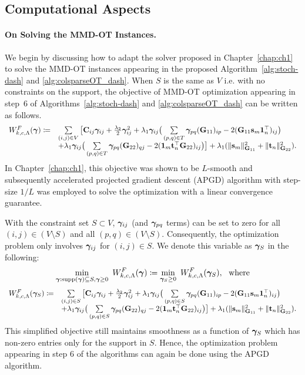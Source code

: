 \subsection{Computational Aspects}
\paragraph{On Solving the MMD-OT Instances.}\label{app:solver}
We begin by discussing how to adapt the solver proposed in Chapter~\ref{chap:ch1} to solve the MMD-OT instances appearing in the proposed Algorithm~\ref{alg:stoch-dash} and \ref{alg:colsparseOT_dash}. When $S$ is the same as $V$ i.e. with no constraints on the support, the objective of MMD-OT optimization appearing in step~6 of Algorithms~\ref{alg:stoch-dash} and \ref{alg:colsparseOT_dash} can be written as follows.
\begin{equation}
\begin{array}{ll}
W^F_{k, c, \Lambda}(\bm{\gamma})\coloneqq  &\sum\limits_{(i,j)\in V} \big[ \mathbf{C}_{ij}\bm{\gamma}_{ij} + \frac{\lambda_2}{2}\bm{\gamma}_{ij}^2 + \lambda_1 \bm{\gamma}_{ij} \big( \sum\limits_{(p,q)\in T} \bm{\gamma}_{pq} (\mathbf{G}_{11})_{ip} - 2(\mathbf{G}_{11}\mathbf{s}_m \mathbf{1}_{n}^{\top})_{ij} \big) \\
&+ \lambda_1 \bm{\gamma}_{ij} \big( \sum\limits_{(p,q)\in T} \bm{\gamma}_{pq}(\mathbf{G}_{22})_{qj} - 2 (\mathbf{1}_m\mathbf{t}_n ^\top \mathbf{G}_{22})_{ij} \big) \big]+\lambda_1(\|\mathbf{s}_m\|^2_{\mathbf{G}_{11}} + \|\mathbf{t}_n\|^2_{\mathbf{G}_{22}}).
\end{array}
\end{equation}
In Chapter~\ref{chap:ch1}, this objective was shown to be $L$-smooth and subsequently accelerated projected gradient descent (APGD) algorithm with step-size $1/L$ was employed to solve the optimization with a linear convergence guarantee.

With the constraint set $S\subset V$, $\bm{\gamma}_{ij}$ (and $\bm{\gamma}_{pq}$ terms) can be set to zero for all $(i,j)\in (V\setminus S)$ and all $(p,q)\in (V\setminus S)$. Consequently, the optimization problem only involves $\bm{\gamma}_{ij}$ for $(i,j)\in S$. We denote this variable as $\bm{\gamma}_S$ in the following:
$$\min_{\bgamma:\Supp(\bgamma)\subseteq S, \bgamma \geq 0}\ \calWF(\bgamma) \coloneqq \min_{\bgamma_S \geq 0}\ \calWF(\bgamma_S), \ \ \textup{where} $$ 
\begin{equation}
\begin{array}{ll}
W^F_{k, c, \Lambda}(\bm{\gamma}_S)\coloneqq  &\sum\limits_{(i,j)\in S} \big[ \mathbf{C}_{ij}\bm{\gamma}_{ij} + \frac{\lambda_2}{2}\bm{\gamma}_{ij}^2 + \lambda_1 \bm{\gamma}_{ij} \big( \sum\limits_{(p,q)\in S} \bm{\gamma}_{pq} (\mathbf{G}_{11})_{ip} - 2(\mathbf{G}_{11}\mathbf{s}_m \mathbf{1}_{n}^{\top})_{ij} \big)\\
&+ \lambda_1 \bm{\gamma}_{ij} \big( \sum\limits_{(p,q)\in S} \bm{\gamma}_{pq}(\mathbf{G}_{22})_{qj} - 2 (\mathbf{1}_m\mathbf{t}_n ^\top \mathbf{G}_{22})_{ij} \big) \big] + \lambda_1(\|\mathbf{s}_m\|^2_{\mathbf{G}_{11}} + \|\mathbf{t}_n\|^2_{\mathbf{G}_{22}}).
\end{array}
\end{equation}
This simplified objective still maintains smoothness as a function of $\bm{\gamma}_S$ which has non-zero entries only for the support in $S$. Hence, the optimization problem appearing in step 6 of the algorithms can again be done using the APGD algorithm.

